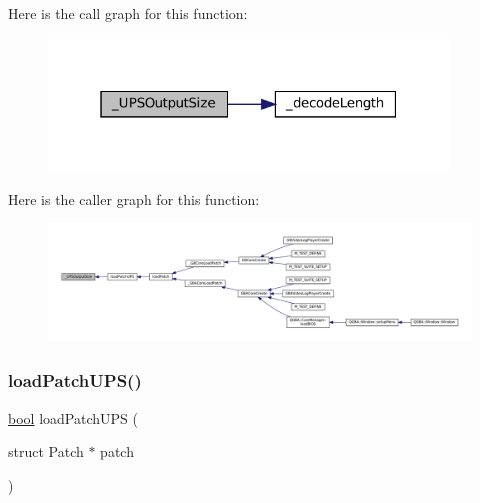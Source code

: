 Here is the call graph for this function\+:
\nopagebreak
\begin{figure}[H]
\begin{center}
\leavevmode
\includegraphics[width=301pt]{patch-ups_8c_a4a463d2dc2f7681f226214c02a505619_cgraph}
\end{center}
\end{figure}
Here is the caller graph for this function\+:
\nopagebreak
\begin{figure}[H]
\begin{center}
\leavevmode
\includegraphics[width=350pt]{patch-ups_8c_a4a463d2dc2f7681f226214c02a505619_icgraph}
\end{center}
\end{figure}
\mbox{\label{patch-ups_8c_abf626a98cecfdfd5e6aa40bfa285e494}} 
\subsubsection{\texorpdfstring{load\+Patch\+U\+P\+S()}{loadPatchUPS()}}
{\footnotesize\ttfamily \mbox{\hyperlink{libretro_8h_a4a26dcae73fb7e1528214a068aca317e}{bool}} load\+Patch\+U\+PS (\begin{DoxyParamCaption}\item[{struct Patch $\ast$}]{patch }\end{DoxyParamCaption})}

